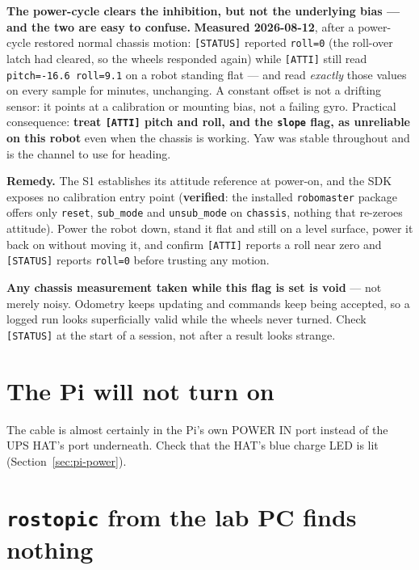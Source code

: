 \documentclass[11pt]{report}
\newenvironment{warningbox}%
  {\begin{lrbox}{\warnbox}\begin{minipage}{0.90\textwidth}}%
  {\end{minipage}\end{lrbox}%
   \begin{center}\fcolorbox{black}{codebg}{\usebox{\warnbox}}\end{center}}
\begin{document}
\begin{warningbox}
\textbf{The power-cycle clears the inhibition, but not the underlying bias
--- and the two are easy to confuse.} \textbf{Measured 2026-08-12}, after a
power-cycle restored normal chassis motion: \texttt{[STATUS]} reported
\texttt{roll=0} (the roll-over latch had cleared, so the wheels responded
again) while \texttt{[ATTI]} still read \texttt{pitch=-16.6 roll=9.1} on a
robot standing flat --- and read \emph{exactly} those values on every sample
for minutes, unchanging. A constant offset is not a drifting sensor: it
points at a calibration or mounting bias, not a failing gyro. Practical
consequence: \textbf{treat \texttt{[ATTI]} pitch and roll, and the
\texttt{slope} flag, as unreliable on this robot} even when the chassis is
working. Yaw was stable throughout and is the channel to use for heading.
\end{warningbox}

\textbf{Remedy.} The S1 establishes its attitude reference at power-on, and
the SDK exposes no calibration entry point (\textbf{verified}: the
installed \texttt{robomaster} package offers only \texttt{reset},
\texttt{sub\_mode} and \texttt{unsub\_mode} on \texttt{chassis}, nothing
that re-zeroes attitude). Power the robot down, stand it flat and still on
a level surface, power it back on without moving it, and confirm
\texttt{[ATTI]} reports a roll near zero and \texttt{[STATUS]} reports
\texttt{roll=0} before trusting any motion.

\begin{warningbox}
\textbf{Any chassis measurement taken while this flag is set is void} ---
not merely noisy. Odometry keeps updating and commands keep being accepted,
so a logged run looks superficially valid while the wheels never turned.
Check \texttt{[STATUS]} at the start of a session, not after a result looks
strange.
\end{warningbox}

\section{The Pi will not turn on}

The cable is almost certainly in the Pi's own POWER IN port instead of the
UPS HAT's port underneath. Check that the HAT's blue charge LED is lit
(Section~\ref{sec:pi-power}).

\section{\texttt{rostopic} from the lab PC finds nothing}
\end{document}
